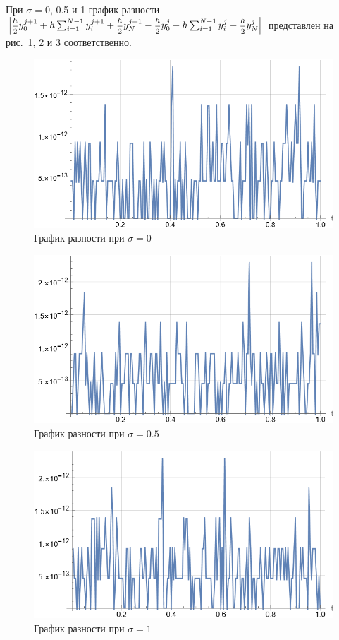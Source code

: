 \documentclass[12pt, a4paper]{article}
\begin{document}
	При $\sigma = 0$, 0.5 и 1 график разности $\Big|\sfrac h2 y_0^{j+1} + h \sum_{i=1}^{N-1} y_i^{j+1} + \sfrac h2 y_N^{j+1} - \sfrac h2 y_0^j - h \sum_{i=1}^{N-1} y_i^j \brop- \sfrac h2 y_N^j\Big|$ представлен на рис.~\ref{diff_0}, \ref{diff_0.5} и \ref{diff_1} соответственно.
	
	\begin{figure}[H]
		\centering
		\includegraphics[width=0.8\linewidth]{diff_0}
		\caption{График разности при $\sigma = 0$}
		\label{diff_0}
	\end{figure}
	
	\begin{figure}[H]
		\centering
		\includegraphics[width=0.8\linewidth]{diff_0.5}
		\caption{График разности при $\sigma = 0.5$}
		\label{diff_0.5}
	\end{figure}
	
	\begin{figure}[H]
		\centering
		\includegraphics[width=0.8\linewidth]{diff_1}
		\caption{График разности при $\sigma = 1$}
		\label{diff_1}
	\end{figure}
	
\end{document}
